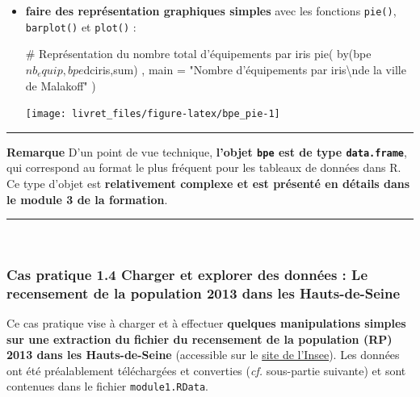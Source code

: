 \documentclass[12pt,twosided, notitlepage]{book}
\newenvironment{Shaded}{}{}
\newcommand{\KeywordTok}[1]{\textcolor[rgb]{0.00,0.00,1.00}{{#1}}}
\newcommand{\DataTypeTok}[1]{{#1}}
\newcommand{\CharTok}[1]{\textcolor[rgb]{0.00,0.50,0.50}{{#1}}}
\newcommand{\StringTok}[1]{\textcolor[rgb]{0.00,0.50,0.50}{{#1}}}
\newcommand{\CommentTok}[1]{\textcolor[rgb]{0.00,0.50,0.00}{{#1}}}
\newcommand{\NormalTok}[1]{{#1}}
\renewenvironment{Shaded}{\begin{snugshade}}{\end{snugshade}}
\begin{document}
\begin{itemize}
\item
  \textbf{faire des représentation graphiques simples} avec les
  fonctions \texttt{pie()},
  \texttt{barplot()} et
  \texttt{plot()} :

\begin{Shaded}
\begin{Highlighting}[]
\CommentTok{# Représentation du nombre total d'équipements par iris}
\KeywordTok{pie}\NormalTok{(}
  \KeywordTok{by}\NormalTok{(bpe$nb_equip,bpe$dciris,sum)}
  \NormalTok{, }\DataTypeTok{main =} \StringTok{"Nombre d'équipements par iris}\CharTok{\textbackslash{}n}\StringTok{de la ville de Malakoff"}
\NormalTok{)}
\end{Highlighting}
\end{Shaded}

  \begin{center}\texttt{[image: livret\_files/figure-latex/bpe\_pie-1]} \end{center}
\end{itemize}

\begin{center}\rule{0.5\linewidth}{\linethickness}\end{center}

\textbf{Remarque} D'un point de vue technique, \textbf{l'objet
\texttt{bpe} est de type \texttt{data.frame}}, qui correspond au format
le plus fréquent pour les tableaux de données dans R. Ce type d'objet
est \textbf{relativement complexe et est présenté en détails dans le
module 3 de la formation}.

\begin{center}\rule{0.5\linewidth}{\linethickness}\end{center}

~

\subsubsection{\texorpdfstring{\textbf{Cas pratique 1.4} Charger et
explorer des données : Le recensement de la population 2013 dans les
Hauts-de-Seine}{Cas pratique 1.4 Charger et explorer des données : Le recensement de la population 2013 dans les Hauts-de-Seine}}\label{cas-pratique-1.4-charger-et-explorer-des-donnees-le-recensement-de-la-population-2013-dans-les-hauts-de-seine}

Ce cas pratique vise à charger et à effectuer \textbf{quelques
manipulations simples sur une extraction du fichier du recensement de la
population (RP) 2013 dans les Hauts-de-Seine} (accessible sur le
\href{https://www.insee.fr/fr/statistiques/2409491}{site de l'Insee}).
Les données ont été préalablement téléchargées et converties (\emph{cf.}
sous-partie suivante) et sont contenues dans le fichier
\texttt{module1.RData}.
\end{document}
